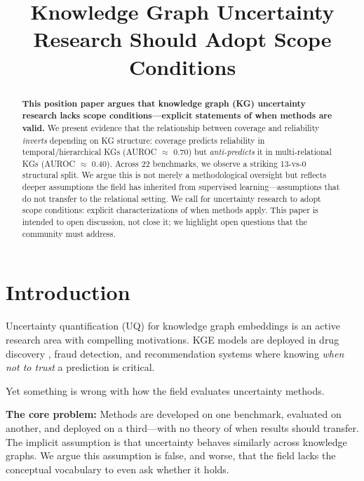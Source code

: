 \documentclass{article}
\title{Knowledge Graph Uncertainty Research Should Adopt Scope Conditions}
\author{}
\begin{document}
\maketitle

\begin{abstract}
\textbf{This position paper argues that knowledge graph (KG) uncertainty research lacks scope conditions---explicit statements of when methods are valid.} We present evidence that the relationship between coverage and reliability \emph{inverts} depending on KG structure: coverage predicts reliability in temporal/hierarchical KGs (AUROC $\approx$ 0.70) but \emph{anti-predicts} it in multi-relational KGs (AUROC $\approx$ 0.40). Across 22 benchmarks, we observe a striking 13-vs-0 structural split. We argue this is not merely a methodological oversight but reflects deeper assumptions the field has inherited from supervised learning---assumptions that do not transfer to the relational setting. We call for uncertainty research to adopt scope conditions: explicit characterizations of when methods apply. This paper is intended to open discussion, not close it; we highlight open questions that the community must address.
\end{abstract}

\section{Introduction}

Uncertainty quantification (UQ) for knowledge graph embeddings is an active research area with compelling motivations. KGE models are deployed in drug discovery \citep{bonner2022review}, fraud detection, and recommendation systems where knowing \emph{when not to trust} a prediction is critical.

Yet something is wrong with how the field evaluates uncertainty methods.

\textbf{The core problem:} Methods are developed on one benchmark, evaluated on another, and deployed on a third---with no theory of when results should transfer. The implicit assumption is that uncertainty behaves similarly across knowledge graphs. We argue this assumption is false, and worse, that the field lacks the conceptual vocabulary to even ask whether it holds.

\begin{center}
\end{center}
\end{document}
